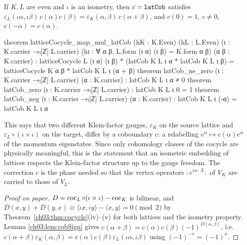 \begin{theorem}\label{ch03:thm:cocCompare}
If $K,L$ are even and $\iota$ is an isometry, then $c=\lean{latCob}$ satisfies
$\varepsilon_L(\iota\alpha,\iota\beta)\,c(\alpha)c(\beta)=\varepsilon_K(\alpha,\beta)\,c(\alpha+
\beta)$, and $c(0)=1$, $c\ne0$, $c(-\alpha)=c(\alpha)$.
\end{theorem}
\begin{leancode}
theorem latticeCocycle_map_mul_latCob (hK : K.Even) (hL : L.Even) (ι : K.carrier →ₗ[ℤ] L.carrier)
    (hι : ∀ α β, L.form (ι α) (ι β) = K.form α β) (α β : K.carrier) :
    latticeCocycle L (ι α) (ι β) * (latCob K L ι α * latCob K L ι β)
      = latticeCocycle K α β * latCob K L ι (α + β)
theorem latCob_ne_zero (ι : K.carrier →ₗ[ℤ] L.carrier) (α : K.carrier) : latCob K L ι α ≠ 0
theorem latCob_zero (ι : K.carrier →ₗ[ℤ] L.carrier) : latCob K L ι 0 = 1
theorem latCob_neg (ι : K.carrier →ₗ[ℤ] L.carrier) (α : K.carrier) :
    latCob K L ι (-α) = latCob K L ι α
\end{leancode}

\begin{physics}
This says that two different Klein-factor gauges, $\varepsilon_K$ on the source lattice and $\varepsilon_L\circ(\iota\times\iota)$ on the target, differ by a coboundary $c$: a relabelling $e^\alpha\mapsto c(\alpha)e^\alpha$ of the momentum eigenstates. Since only cohomology classes of the cocycle are physically meaningful, this is the statement that an isometric embedding of lattices respects the Klein-factor structure up to the gauge freedom. The correction $c$ is the phase needed so that the vertex operators $:\!e^{i\alpha\cdot X}\!:$ of $V_K$ are carried to those of $V_L$.
\end{physics}
\begin{proof}[Proof on paper]
$D=\operatorname{coc}_L\circ(\iota\times\iota)-\operatorname{coc}_K$ is bilinear, and
$D(x,y)+D(y,x)\equiv\langle\iota x,\iota y\rangle-\langle x,y\rangle=0\pmod 2$ by
Theorem~\ref{ch03:thm:cocycle}(iv)--(v) for both lattices and the isometry property. Lemma
\ref{ch03:lem:cobSign} gives $c(\alpha+\beta)=c(\alpha)c(\beta)(-1)^{D(\alpha,\beta)}$, i.e.\
$c(\alpha+\beta)\varepsilon_K(\alpha,\beta)=c(\alpha)c(\beta)\varepsilon_L(\iota\alpha,\iota\beta)$
using $(-1)^{-x}=(-1)^x$.
\end{proof}

